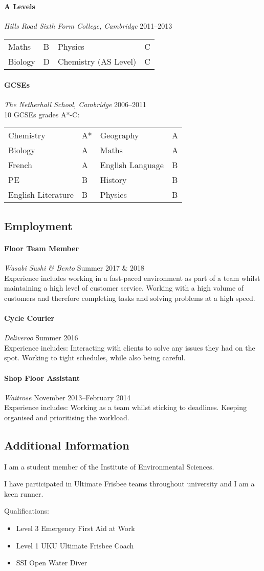 \documentclass[11pt,a4paper]{article}
\newcommand{\centry}[3]{\paragraph{#1} \textit{#2}%
\hfill#3\\[2pt]}
\begin{document}
\centry{A Levels}{Hills Road Sixth Form College, Cambridge} {2011--2013}
\begin{center}
  \begin{tabular}{llll}
    Maths & B & Physics & C \\
    Biology & D  & Chemistry (AS Level) & C\\
  \end{tabular}
\end{center}

\centry{GCSEs}{The Netherhall School, Cambridge}{2006--2011} 
10 GCSEs grades A*-C:
\begin{center}
  \begin{tabular}{llll}
    Chemistry & A* & Geography & A \\
    Biology& A & Maths& A \\
    French& A & English Language& B \\
    PE& B &  History& B\\
    English Literature& B & Physics& B\\
  \end{tabular}
\end{center}

\subsection*{Employment}

\centry{Floor Team Member}{Wasabi Sushi \& Bento}{Summer 2017 \& 2018}

Experience includes working in a fast-paced environment as part of a team whilst 
maintaining a high level of customer service. Working with a high volume of 
customers and therefore completing tasks and solving problems at a high speed. 

\centry{Cycle Courier}{Deliveroo}{Summer 2016}

Experience includes: Interacting with clients to solve any issues they had on 
the spot. Working to tight schedules, while also being careful. 


\centry{Shop Floor Assistant}{Waitrose}{November 2013--February 2014}

Experience includes: Working as a team whilst sticking to deadlines. 
Keeping organised and prioritising the workload.

\subsection*{Additional Information}

I am a student member of the Institute of Environmental Sciences.

I have participated in Ultimate Frisbee teams throughout university and I am a keen runner.

Qualifications:
\begin{itemize}
  \item Level 3 Emergency First Aid at Work    
  \item Level 1 UKU Ultimate Frisbee Coach
  \item SSI Open Water Diver
\end{itemize}
\end{document}
